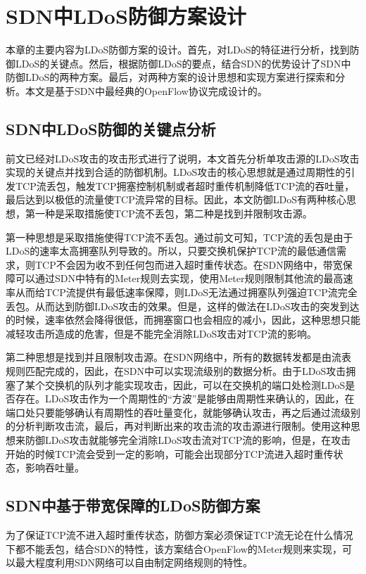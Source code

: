 \chapter{SDN中LDoS防御方案设计}
\label{cha:design}
本章的主要内容为LDoS防御方案的设计。首先，对LDoS的特征进行分析，找到防御LDoS的关键点。然后，根据防御LDoS的要点，结合SDN的优势设计了SDN中防御LDoS的两种方案。最后，对两种方案的设计思想和实现方案进行探索和分析。本文是基于SDN中最经典的OpenFlow协议完成设计的。

\section{SDN中LDoS防御的关键点分析}
\label{chap4:keyanalysis}
前文已经对LDoS攻击的攻击形式进行了说明，本文首先分析单攻击源的LDoS攻击实现的关键点并找到合适的防御机制。LDoS攻击的核心思想就是通过周期性的引发TCP流丢包，触发TCP拥塞控制机制或者超时重传机制降低TCP流的吞吐量，最后达到以极低的流量使TCP流异常的目标。因此，本文防御LDoS有两种核心思想，第一种是采取措施使TCP流不丢包，第二种是找到并限制攻击源。

第一种思想是采取措施使得TCP流不丢包。通过前文可知，TCP流的丢包是由于LDoS的速率太高拥塞队列导致的。所以，只要交换机保护TCP流的最低通信需求，则TCP不会因为收不到任何包而进入超时重传状态。在SDN网络中，带宽保障可以通过SDN中特有的Meter规则去实现，使用Meter规则限制其他流的最高速率从而给TCP流提供有最低速率保障，则LDoS无法通过拥塞队列强迫TCP流完全丢包。从而达到防御LDoS攻击的效果。但是，这样的做法在LDoS攻击的突发到达的时候，速率依然会降得很低，而拥塞窗口也会相应的减小，因此，这种思想只能减轻攻击所造成的危害，但是不能完全消除LDoS攻击对TCP流的影响。

第二种思想是找到并且限制攻击源。在SDN网络中，所有的数据转发都是由流表规则匹配完成的，因此，在SDN中可以实现流级别的数据分析。由于LDoS攻击拥塞了某个交换机的队列才能实现攻击，因此，可以在交换机的端口处检测LDoS是否存在。LDoS攻击作为一个周期性的“方波”是能够由周期性来确认的，因此，在端口处只要能够确认有周期性的吞吐量变化，就能够确认攻击，再之后通过流级别的分析判断攻击流，最后，再对判断出来的攻击流的攻击源进行限制。使用这种思想来防御LDoS攻击就能够完全消除LDoS攻击流对TCP流的影响，但是，在攻击开始的时候TCP流会受到一定的影响，可能会出现部分TCP流进入超时重传状态，影响吞吐量。

\section{SDN中基于带宽保障的LDoS防御方案}
\label{chap4:bandguatee}

为了保证TCP流不进入超时重传状态，防御方案必须保证TCP流无论在什么情况下都不能丢包，结合SDN的特性，该方案结合OpenFlow的Meter规则来实现，可以最大程度利用SDN网络可以自由制定网络规则的特性。

